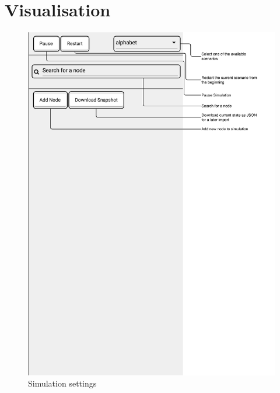 \section{Visualisation}
\begin{figure}[H]
\centering
\includegraphics[width=1\textwidth]{graphics/analysis-tools/visualisation-sidebar-sim-settings.pdf}
\caption{Simulation settings}
\label{fig:anl-sim-settings}
\end{figure}

